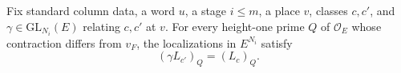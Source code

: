 
\begin{formalstatement}\label{pn:P096}
Fix standard column data, a word $u$, a stage $i\le m$, a place $v$,
classes $c,c'$, and $\gamma\in\mathrm{GL}_{N_i}(E)$ relating $c,c'$
at $v$. For every height-one prime $Q$ of $\mathcal O_E$ whose
contraction differs from $v_F$, the localizations in $E^{N_i}$ satisfy
\[
                         (\gamma L_{c'})_Q=(L_c)_Q .
\]
\end{formalstatement}
